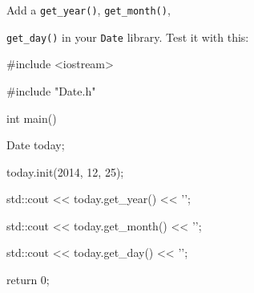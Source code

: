 Add a \texttt{get\_year()}, \texttt{get\_month()},

\texttt{get\_day()} in your \texttt{Date} library. Test it with this:



\begin{consolethree}[escapeinside=||]

#include <iostream>

#include "Date.h"



int main()

{

    Date today;

    today.init(2014, 12, 25);

    std::cout << today.get_year() << '\n';

    std::cout << today.get_month() << '\n';

    std::cout << today.get_day() << '\n';

    return 0;

}

\end{consolethree}

